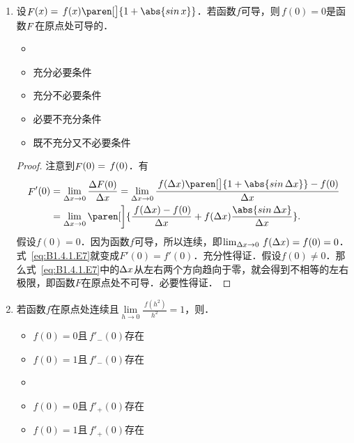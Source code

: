 \begin{enumerate}
\item 设\(\Fn F(x) = \,f(x) \paren[\big]{1+\abs{\sin x}}\)．若函数\(f\)可导，则\(\,f(0) = 0\)是函数\(\mathop{\relax F}\nolimits\)在原点处可导的\uline{\hfill}．
  \begin{itemize}
    \renewcommand{\labelitemi}{\faCircleThin}
    \ifshowsol
    \item[\faCircle]
    \else
    \item
    \fi
    充分必要条件
  \item 充分不必要条件
  \item 必要不充分条件
  \item 既不充分又不必要条件
  \end{itemize}

  \ifshowsol
    \begin{proof}
      注意到\(\mathop{\relax F}\nolimits(0) = \,f(0)\)．有
      \begin{equation}
        \begin{split}
          \Fn F'(0)
          &= \lim_{\fdx\to0} \frac{\fwdf F(0)}{\fdx}
            = \lim_{\fdx\to0} \frac{\,f(\fdx)\paren[\big]{1+\abs{\sin\fdx}} - f(0)}{\fdx} \\
          &= \lim_{\fdx\to0} \paren[\bigg]{
            \frac{\,f(\fdx) - f(0)}{\fdx}
            + f(\fdx) \frac{\abs{\sin\fdx}}{\fdx}}.
        \end{split}
        \label{eq:B1.4.1.E7}
      \end{equation}
      假设\(f(0) = 0\)．因为函数\(f\)可导，所以连续，即\(\lim_{\mathop{}\!\Delta x\to0} \,f(\mathop{}\!\Delta x) = f(0) = 0\)．式~\eqref{eq:B1.4.1.E7}就变成\(F'(0) = f'(0)\)．充分性得证．假设\(f(0) \ne 0\)．那么式~\eqref{eq:B1.4.1.E7}中的\(\mathop{}\!\Delta x\)从左右两个方向趋向于零，就会得到不相等的左右极限，即函数\(F\)在原点处不可导．必要性得证．
    \end{proof}
  \fi

\item 若函数\(f\)在原点处连续且\(\lim\limits_{h\to0} \frac{\,f(h^2)}{h^2} = 1\)，则\uline{\hspace{8em}}．
  \begin{itemize}
    \renewcommand{\labelitemi}{\faCircleThin}
  \item \(f(0) = 0\)且\(\,f'_-(0)\)存在
  \item \(f(0) = 1\)且\(\,f'_-(0)\)存在
    \ifshowsol
    \item[\faCircle]
    \else
    \item
    \fi
    \(f(0) = 0\)且\(\,f'_+(0)\)存在
  \item \(f(0) = 1\)且\(\,f'_+(0)\)存在
  \end{itemize}


\end{enumerate}
